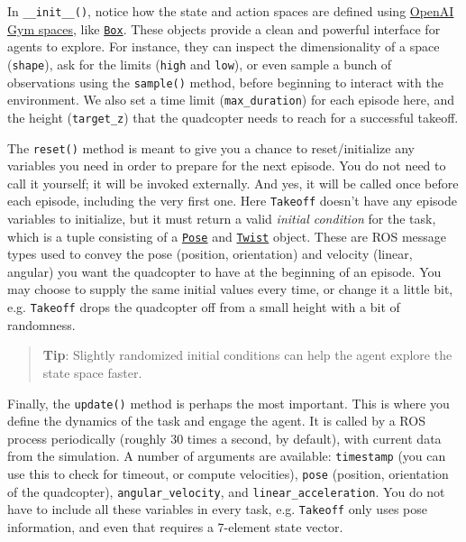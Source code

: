 \documentclass[11pt]{article}
\begin{document}
In \texttt{\_\_init\_\_()}, notice how the state and action spaces are
defined using \href{https://gym.openai.com/docs/\#spaces}{OpenAI Gym
spaces}, like
\href{https://github.com/openai/gym/blob/master/gym/spaces/box.py}{\texttt{Box}}.
These objects provide a clean and powerful interface for agents to
explore. For instance, they can inspect the dimensionality of a space
(\texttt{shape}), ask for the limits (\texttt{high} and \texttt{low}),
or even sample a bunch of observations using the \texttt{sample()}
method, before beginning to interact with the environment. We also set a
time limit (\texttt{max\_duration}) for each episode here, and the
height (\texttt{target\_z}) that the quadcopter needs to reach for a
successful takeoff.

The \texttt{reset()} method is meant to give you a chance to
reset/initialize any variables you need in order to prepare for the next
episode. You do not need to call it yourself; it will be invoked
externally. And yes, it will be called once before each episode,
including the very first one. Here \texttt{Takeoff} doesn't have any
episode variables to initialize, but it must return a valid
\emph{initial condition} for the task, which is a tuple consisting of a
\href{http://docs.ros.org/api/geometry_msgs/html/msg/Pose.html}{\texttt{Pose}}
and
\href{http://docs.ros.org/api/geometry_msgs/html/msg/Twist.html}{\texttt{Twist}}
object. These are ROS message types used to convey the pose (position,
orientation) and velocity (linear, angular) you want the quadcopter to
have at the beginning of an episode. You may choose to supply the same
initial values every time, or change it a little bit, e.g.
\texttt{Takeoff} drops the quadcopter off from a small height with a bit
of randomness.

\begin{quote}
\textbf{Tip}: Slightly randomized initial conditions can help the agent
explore the state space faster.
\end{quote}

Finally, the \texttt{update()} method is perhaps the most important.
This is where you define the dynamics of the task and engage the agent.
It is called by a ROS process periodically (roughly 30 times a second,
by default), with current data from the simulation. A number of
arguments are available: \texttt{timestamp} (you can use this to check
for timeout, or compute velocities), \texttt{pose} (position,
orientation of the quadcopter), \texttt{angular\_velocity}, and
\texttt{linear\_acceleration}. You do not have to include all these
variables in every task, e.g. \texttt{Takeoff} only uses pose
information, and even that requires a 7-element state vector.
\end{document}
